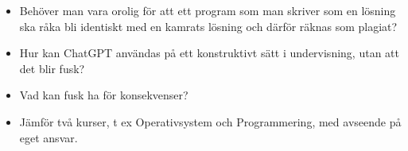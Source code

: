 \begin{frame}
  \begin{question}[5 min]
    \begin{itemize}
      \item Behöver man vara orolig för att ett program som man skriver som en 
        lösning ska råka bli identiskt med en kamrats lösning och därför räknas 
        som plagiat?
    \end{itemize}
  \end{question}
\end{frame}

\begin{frame}
  \begin{question}[10 min]
    \begin{itemize}
      \item Hur kan ChatGPT användas på ett konstruktivt sätt i undervisning, 
        utan att det blir fusk?
    \end{itemize}
  \end{question}
\end{frame}

\begin{frame}
  \begin{question}[10 min]
    \begin{itemize}
      \item Vad kan fusk ha för konsekvenser?
    \end{itemize}
  \end{question}
\end{frame}

\begin{frame}
  \begin{question}[5 min]
    \begin{itemize}
      \item Jämför två kurser, t ex Operativsystem och Programmering, med 
        avseende på eget ansvar.
    \end{itemize}
  \end{question}
\end{frame}

\endinput

\begin{frame}
  \begin{question}
    \begin{itemize}
      \item Vilka kurser läser du nu? Berätta för årskursen under vad dom har 
        att vänta sig!
    \end{itemize}
  \end{question}
\end{frame}

